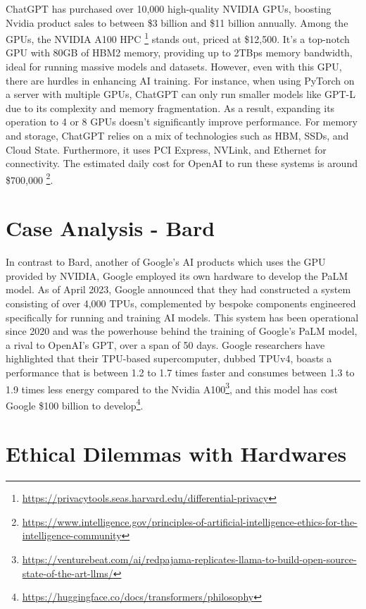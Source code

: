 \documentclass[
]{book}
\begin{document}
ChatGPT has purchased over 10,000 high-quality NVIDIA GPUs, boosting Nvidia product sales to between \$3 billion and \$11 billion annually. Among the GPUs, the NVIDIA A100 HPC \footnote{\url{https://privacytools.seas.harvard.edu/differential-privacy}} stands out, priced at \$12,500. It's a top-notch GPU with 80GB of HBM2 memory, providing up to 2TBps memory bandwidth, ideal for running massive models and datasets. However, even with this GPU, there are hurdles in enhancing AI training. For instance, when using PyTorch on a server with multiple GPUs, ChatGPT can only run smaller models like GPT-L due to its complexity and memory fragmentation. As a result, expanding its operation to 4 or 8 GPUs doesn't significantly improve performance. For memory and storage, ChatGPT relies on a mix of technologies such as HBM, SSDs, and Cloud State. Furthermore, it uses PCI Express, NVLink, and Ethernet for connectivity. The estimated daily cost for OpenAI to run these systems is around \$700,000 \footnote{\url{https://www.intelligence.gov/principles-of-artificial-intelligence-ethics-for-the-intelligence-community}}.

\hypertarget{case-analysis---bard}{%
\section{Case Analysis - Bard}\label{case-analysis---bard}}

In contrast to Bard, another of Google's AI products which uses the GPU provided by NVIDIA, Google employed its own hardware to develop the PaLM model. As of April 2023, Google announced that they had constructed a system consisting of over 4,000 TPUs, complemented by bespoke components engineered specifically for running and training AI models. This system has been operational since 2020 and was the powerhouse behind the training of Google's PaLM model, a rival to OpenAI's GPT, over a span of 50 days. Google researchers have highlighted that their TPU-based supercomputer, dubbed TPUv4, boasts a performance that is between 1.2 to 1.7 times faster and consumes between 1.3 to 1.9 times less energy compared to the Nvidia A100\footnote{\url{https://venturebeat.com/ai/redpajama-replicates-llama-to-build-open-source-state-of-the-art-llms/}}, and this model has cost Google \$100 billion to develop\footnote{\url{https://huggingface.co/docs/transformers/philosophy}}.

\hypertarget{ethical-dilemmas-with-hardwares}{%
\section{Ethical Dilemmas with Hardwares}\label{ethical-dilemmas-with-hardwares}}
\end{document}
